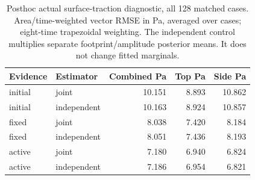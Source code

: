 \begin{table}[!t]\centering\small\setlength{\tabcolsep}{4pt}
\caption{Posthoc actual surface-traction diagnostic, all 128 matched cases. Area/time-weighted vector RMSE in Pa, averaged over cases; eight-time trapezoidal weighting. The independent control multiplies separate footprint/amplitude posterior means. It does not change fitted marginals.}
\begin{tabular}{llrrr}\toprule
Evidence & Estimator & Combined Pa & Top Pa & Side Pa\\\midrule
initial & joint & 10.151 & 8.893 & 10.862\\
initial & independent & 10.163 & 8.924 & 10.857\\
fixed & joint & 8.038 & 7.420 & 8.184\\
fixed & independent & 8.051 & 7.436 & 8.193\\
active & joint & 7.180 & 6.940 & 6.824\\
active & independent & 7.186 & 6.954 & 6.821\\
\bottomrule\end{tabular}
\end{table}